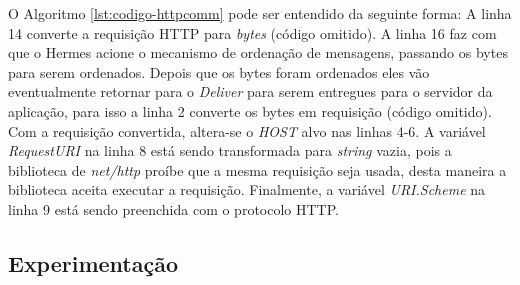 \begin{minipage}{\textwidth}
\begin{center}

\end{center}
\end{minipage}

O Algoritmo \ref{lst:codigo-httpcomm} pode ser entendido da seguinte forma: A linha 14 converte a requisição \gls{HTTP} para \textit{bytes} (código omitido). A linha 16 faz com que o Hermes acione o mecanismo de ordenação de mensagens, passando os bytes para serem ordenados. Depois que os bytes foram ordenados eles vão eventualmente retornar para o \textit{Deliver} para serem entregues para o servidor da aplicação, para isso a linha 2 converte os bytes em requisição (código omitido). Com a requisição convertida, altera-se o \textit{HOST} alvo nas linhas 4-6. A variável \textit{RequestURI} na linha 8 está sendo transformada para \textit{string} vazia, pois a biblioteca de \textit{net/http} proíbe que a mesma requisição seja usada, desta maneira a biblioteca aceita executar a requisição. Finalmente, a variável \textit{URI.Scheme} na linha 9 está sendo preenchida com o protocolo \gls{HTTP}.



\subsection{Experimentação}


